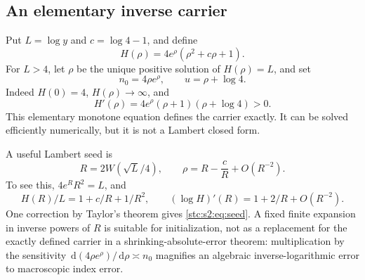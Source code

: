 \documentclass[11pt,letterpaper]{article}
\numberwithin{equation}{section}
\theoremstyle{remark}\newtheorem{remark}[theorem]{Remark}
\newcommand{\dd}{\,\mathrm d}
\begin{document}
\subsection{An elementary inverse carrier}
Put $L=\log y$ and $c=\log4-1$, and define
\begin{equation}\label{stc:s2:eq:H}
 H(\rho)=4e^\rho(\rho^2+c\rho+1).
\end{equation}
For $L>4$, let $\rho$ be the unique positive solution of $H(\rho)=L$, and set
\begin{equation}\label{stc:s2:eq:carrier}
 n_0=4\rho e^\rho,\qquad u=\rho+\log4.
\end{equation}
Indeed $H(0)=4$, $H(\rho)\to\infty$, and
\[
 H'(\rho)=4e^\rho(\rho+1)(\rho+\log4)>0.
\]
This elementary monotone equation defines the carrier exactly. It can be solved efficiently numerically, but it is not a Lambert closed form.

A useful Lambert seed is
\begin{equation}\label{stc:s2:eq:seed}
 R=2W(\sqrt L/4),\qquad \rho=R-\frac cR+O(R^{-2}).
\end{equation}
To see this, $4e^RR^2=L$, and
\[
 H(R)/L=1+c/R+1/R^2,
 \qquad (\log H)'(R)=1+2/R+O(R^{-2}).
\]
One correction by Taylor's theorem gives \eqref{stc:s2:eq:seed}. A fixed finite expansion in inverse powers of $R$ is suitable for initialization, not as a replacement for the exactly defined carrier in a shrinking-absolute-error theorem: multiplication by the sensitivity $\dd(4\rho e^\rho)/\dd\rho\asymp n_0$ magnifies an algebraic inverse-logarithmic error to macroscopic index error.
\end{document}

